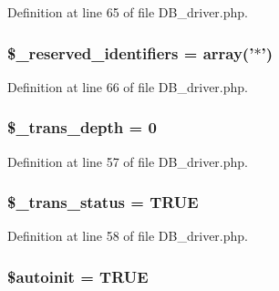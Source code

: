 Definition at line 65 of file D\-B\-\_\-driver.\-php.

\hypertarget{class_c_i___d_b__driver_aa3298c4c62fbee8bb09f1b75b633fb0d}{
\subsubsection[{\$\-\_\-reserved\-\_\-identifiers}]{\setlength{\rightskip}{0pt plus 5cm}\$\-\_\-reserved\-\_\-identifiers = array('$\ast$')}}\label{class_c_i___d_b__driver_aa3298c4c62fbee8bb09f1b75b633fb0d}


Definition at line 66 of file D\-B\-\_\-driver.\-php.

\hypertarget{class_c_i___d_b__driver_a0724b7f82d62f35ef5e150146ed2a27b}{
\subsubsection[{\$\-\_\-trans\-\_\-depth}]{\setlength{\rightskip}{0pt plus 5cm}\$\-\_\-trans\-\_\-depth = 0}}\label{class_c_i___d_b__driver_a0724b7f82d62f35ef5e150146ed2a27b}


Definition at line 57 of file D\-B\-\_\-driver.\-php.

\hypertarget{class_c_i___d_b__driver_a93acf0189d34131e156c6eb4a48c2b5b}{
\subsubsection[{\$\-\_\-trans\-\_\-status}]{\setlength{\rightskip}{0pt plus 5cm}\$\-\_\-trans\-\_\-status = T\-R\-U\-E}}\label{class_c_i___d_b__driver_a93acf0189d34131e156c6eb4a48c2b5b}


Definition at line 58 of file D\-B\-\_\-driver.\-php.

\hypertarget{class_c_i___d_b__driver_a97d3ccf64e5b873ebca99d17a2c204d3}{
\subsubsection[{\$autoinit}]{\setlength{\rightskip}{0pt plus 5cm}\$autoinit = T\-R\-U\-E}}\label{class_c_i___d_b__driver_a97d3ccf64e5b873ebca99d17a2c204d3}


